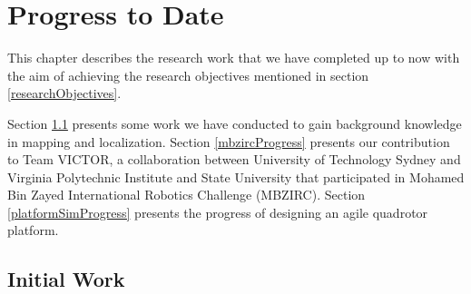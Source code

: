 \documentclass[12pt,a4paper]{report}
\begin{document}
\begin{landscape}
\end{landscape}

\chapter{Progress to Date}
\label{progress}
This chapter describes the research work that we have completed up to now  with the aim of achieving the research objectives mentioned in section \ref{researchObjectives}. \par

Section \ref{initialWork} presents some work we have conducted to gain background knowledge in mapping and localization. Section \ref{mbzircProgress} presents our contribution to Team VICTOR, a collaboration between University of Technology Sydney and Virginia Polytechnic Institute and State University that participated in Mohamed Bin Zayed International Robotics Challenge (MBZIRC). Section \ref{platformSimProgress} presents the progress of designing an agile quadrotor platform.

\section{Initial Work}
\label{initialWork}
\end{document}
